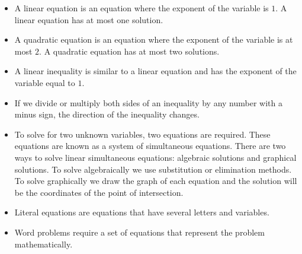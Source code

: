 \begin{itemize}[noitemsep]
\item A linear equation is an equation where the exponent of the variable is $1$. A linear equation has at most one solution.
\item A quadratic equation is an equation where the exponent of the variable is at most $2$. A quadratic equation has at most two solutions.
\item A linear inequality is similar to a linear equation and has the exponent of the variable equal to $1$.
\item If we divide or multiply both sides of an inequality by any number with a minus sign, the direction of the inequality changes. 
\item To solve for two unknown variables, two equations are
  required. These equations are known as a system of simultaneous
  equations. There are two ways to solve linear simultaneous
  equations: algebraic solutions and graphical solutions. To solve
  algebraically we use substitution or elimination methods. To solve
  graphically we draw the graph of each equation and the solution will
  be the coordinates of the point of intersection.
\item Literal equations are equations that have several letters and variables.
\item Word problems require a set of equations that represent the problem mathematically. 
\end{itemize}


